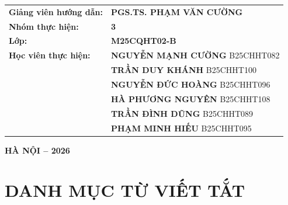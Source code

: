 \documentclass[12pt,a4paper]{article}
\numberwithin{equation}{section}
\renewcommand{\arraystretch}{1.15}
\begin{document}
\begin{titlepage}
    \vspace{1.2cm}
    \begin{center}
        \begin{minipage}{0.88\textwidth}
        \fontsize{12pt}{15pt}\selectfont
        \renewcommand{\arraystretch}{1.3}
        \begin{tabularx}{\textwidth}{@{}>{\bfseries}l X@{}}
        Giảng viên hướng dẫn: & \textbf{PGS.TS. PHẠM VĂN CƯỜNG} \\[0.8em]
        Nhóm thực hiện: & \textbf{3} \\[0.8em]
        Lớp: & \textbf{M25CQHT02-B} \\[0.8em]
        Học viên thực hiện: &
        \textbf{NGUYỄN MẠNH CƯỜNG} \quad B25CHHT082 \\
        & \textbf{TRẦN DUY KHÁNH} \quad B25CHHT100 \\
        & \textbf{NGUYỄN ĐỨC HOÀNG} \quad B25CHHT096 \\
        & \textbf{HÀ PHƯƠNG NGUYÊN} \quad B25CHHT108 \\
        & \textbf{TRẦN ĐÌNH DŨNG} \quad B25CHHT089 \\
        & \textbf{PHẠM MINH HIẾU} \quad B25CHHT095 \\
        \end{tabularx}
        \end{minipage}
    \end{center}

    \vfill
    \fontsize{12pt}{14pt}\selectfont\textbf{HÀ NỘI -- 2026}\par
    \vspace{0.5cm}
\end{titlepage}


\tableofcontents
\clearpage

\listoffigures
\vspace{1.5em}
\listoftables
\clearpage

\section*{DANH MỤC TỪ VIẾT TẮT}
\end{document}
